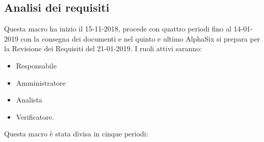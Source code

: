     \subsection{Analisi dei requisiti}
        Questa macro ha inizio il 15-11-2018, procede con quattro periodi fino al 14-01-2019 con la consegna dei documenti e nel
        quinto e ultimo AlphaSix si prepara per la Revisione dei Requisiti del 21-01-2019. I ruoli attivi saranno: 
        \begin{itemize}
            \item Responsabile
            \item Amministratore
            \item Analista
            \item Verificatore.
        \end{itemize}
        Questa macro è stata divisa in cinque periodi:
